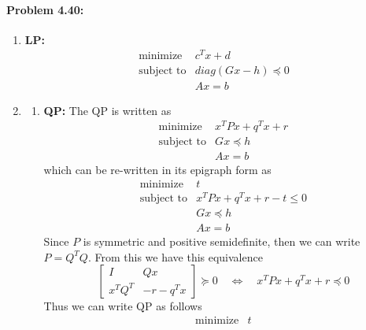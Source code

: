 \documentclass[12pt] {article}
\begin{document}
\paragraph{Problem 4.40:} 
\begin{enumerate}
\item  \textbf{LP:}
\[
\begin{array}{cl}
\text{minimize} & c^{T}x +d\\
\text{subject to} & diag(Gx - h) \preceq 0\\
&Ax = b
\end{array} 
\]
\item 
\begin{enumerate}
\item \textbf{QP:} The QP is written as 
\[
\begin{array}{cl}
\text{minimize} & x^{T}Px+q^{T}x+r\\
\text{subject to} & Gx \preceq h\\
&Ax = b
\end{array} 
\]
which can be re-written in its epigraph form as 
\[
\begin{array}{cl}
\text{minimize} & t\\
\text{subject to} & x^{T}Px + q^{T}x + r - t \leq 0 \\
& Gx \preceq h\\
&Ax = b
\end{array} 
\]
Since $P$ is symmetric and positive semidefinite, then we can write $P=Q^{T}Q$. From this we have this equivalence  
\[
\left[
\begin{array}{cc}
I & Qx \\
x^{T}Q^{T} & -r-q^{T}x
\end{array} 
\right]
\succeq 0 
\quad \Longleftrightarrow  \quad 
x^{T}Px + q^{T}x + r \preceq 0 
\]
Thus we can write QP as follows 
\[
\begin{array}{cl}
\text{minimize} & t\\


\end{array}\]
\end{enumerate}
\end{enumerate}
\end{document}
